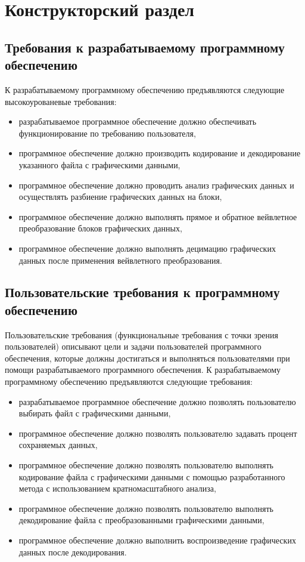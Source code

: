 \chapter{Конструкторский раздел}
\label{cha:design}

\section{Требования к разрабатываемому программному обеспечению}
К разрабатываемому программному обеспечению предъявляются следующие высокоурованевые требования:
\begin{itemize}
 \item разрабатываемое программное обеспечение должно обеспечивать функционирование по требованию пользователя,
 \item программное обеспечение должно производить кодирование и декодирование указанного файла с графическими данными,
 \item программное обеспечение должно проводить анализ графических данных и осуществлять разбиение графических данных на блоки,
 \item программное обеспечение должно выполнять прямое и обратное вейвлетное преобразование блоков графических данных,
 \item программное обеспечение должно выполнять децимацию графических данных после применения вейвлетного преобразования.
\end{itemize}

\section{Пользовательские требования к программному обеспечению}
Пользовательские требования (функциональные требования с точки зрения пользователей) описывают цели и задачи пользователей
программного обеспечения, которые должны достигаться и выполняться пользователями при помощи разрабатываемого программного обеспечения.
К разрабатываемому программному обеспечению предъявляются следующие требования:
\begin{itemize}
 \item разрабатываемое программное обеспечение должно позволять пользователю выбирать файл с графическими данными,
 \item программное обеспечение должно позволять пользователю задавать процент сохраняемых данных,
 \item программное обеспечение должно позволять пользователю выполнять кодирование файла с графическими данными с помощью разработанного метода 
 с использованием кратномасштабного анализа,
 \item программное обеспечение должно позволять пользователю выполнять декодирование файла с преобразованными графическими данными,
 \item программное обеспечение должно выполнить воспроизведение графических данных после декодирования.
\end{itemize}

